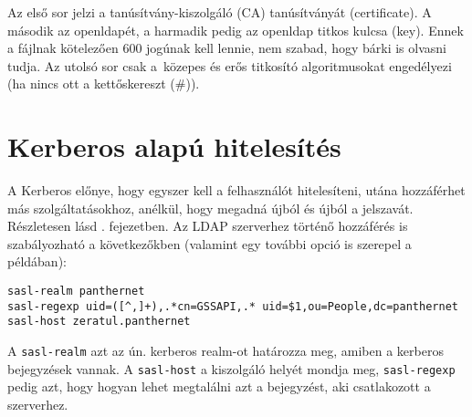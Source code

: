 Az első sor jelzi a tanúsítvány-kiszolgáló (CA) tanúsítványát (certificate). A második az openldapét, a harmadik pedig
az openldap titkos kulcsa (key). Ennek a fájlnak kötelezően 600 jogúnak kell lennie, nem szabad, hogy bárki is olvasni
tudja. Az utolsó sor csak a~közepes és erős titkosító algoritmusokat engedélyezi (ha nincs ott a kettőskereszt (\#)).






\section{Kerberos alapú hitelesítés}

A Kerberos előnye, hogy egyszer kell a felhasználót hitelesíteni, utána hozzáférhet más szolgáltatásokhoz, anélkül, hogy
megadná újból és újból a jelszavát. Részletesen lásd . fejezetben. Az LDAP szerverhez történő
hozzáférés is szabályozható a következőkben (valamint egy további opció is szerepel a példában):

\begin{Verbatim}[frame=single]
sasl-realm panthernet
sasl-regexp uid=([^,]+),.*cn=GSSAPI,.* uid=$1,ou=People,dc=panthernet
sasl-host zeratul.panthernet
\end{Verbatim}

A \texttt{sasl-realm} azt az ún. kerberos realm-ot határozza meg, amiben a kerberos bejegyzések vannak. A
\texttt{sasl-host} a kiszolgáló helyét mondja meg, \texttt{sasl-regexp} pedig azt, hogy hogyan lehet megtalálni azt a
bejegyzést, aki csatlakozott a szerverhez.

